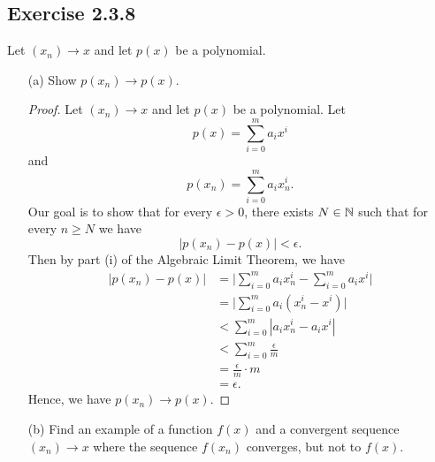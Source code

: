 \subsection{Exercise 2.3.8}
Let \( (x_n) \to x \) and let \( p(x)\) be a polynomial.
\begin{enumerate}
    \item[(a)] Show \( p(x_n) \to p(x)\).
        \begin{proof}
            Let \( (x_n) \to x \) and let \( p(x)\) be a polynomial. Let 
            \[ p(x) = \sum_{i=0}^{m} a_i x^i\]
            and 
            \[ p(x_n) = \sum_{i=0}^{m} a_i x_n^{i}. \]
            Our goal is to show that for every \( \epsilon > 0\), there exists \( N \in \mathbb{N} \) such that for every \( n \geq N \)            we have 
            \[ | p(x_n) - p(x)| < \epsilon.\]
           Then by part (i) of the Algebraic Limit Theorem, we have
           \begin{align*}
            | p(x_n) - p(x) |  &= \Big| \sum_{i=0}^{m} a_i x_n^{i} - \sum_{i=0}^{ m} a_i x^{i}  \Big| \\
                               &= \Big| \sum_{i=0}^{m} a_i (x^i_n - x^i)  \Big| \\
                               &<  \sum_{ i = 0}^{ m} | a_ix^i_n - a_ix^i | \tag{T.I}\\     
                               &<  \sum_{i=0}^{m} \frac{ \epsilon }{ m}  \tag{\(x_n \to x\)} \\
                               &= \frac{ \epsilon }{m }  \cdot m \\ 
                               &= \epsilon. 
           \end{align*}
           Hence, we have \( p(x_n) \to p(x)\).

        \end{proof}
    \item[(b)] Find an example of a function \( f(x)\) and a convergent sequence \( (x_n) \to x\) where the sequence \( f(x_n)\) converges, but not to \( f(x)\).
        
\end{enumerate}

